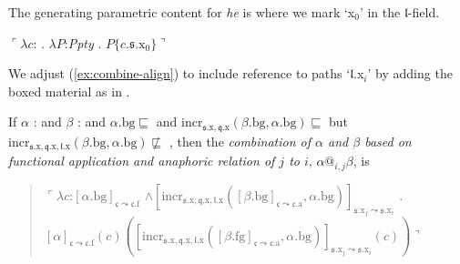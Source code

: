 The generating parametric content for \textit{he} is \nexteg{} where we
mark `x$_0$' in the $\mathfrak{l}$-field.
\begin{ex} 
  $\ulcorner\lambda c$: . $\lambda
  P$:\textit{Ppty} . $P\{c.\mathfrak{s}.\text{x}_0\}\urcorner$
\end{ex} 
We adjust (\ref{ex:combine-align}) to include reference to paths
`$\mathfrak{l}$.x$_i$' by adding the boxed material as in \nexteg{}.
\begin{ex} 
If $\alpha$ :  
and $\beta$ : 
and $\alpha.\text{bg}\sqsubseteq$  and
  $\mathrm{incr}_{\mathfrak{s}.\text{x},\mathfrak{q}.\text{x}}(\beta.\text{bg},\alpha.\text{bg})\sqsubseteq$
   but $\mathrm{incr}_{\mathfrak{s}.\text{x},\mathfrak{q}.\text{x},\mathfrak{l}.\text{x}}(\beta.\text{bg},\alpha.\text{bg})\not\sqsubseteq$
   ,
                         then the \textit{combination of $\alpha$ and
    $\beta$  based on functional application and anaphoric
      relation of $j$ to $i$}, $\alpha\text{@}_{i,j}\beta$, is
  \begin{quote}
    $\ulcorner\lambda c$:$[\alpha.\text{bg}]_{\mathfrak{c}\leadsto\mathfrak{c}.\text{f}}$
      \d{$\wedge$}$[\mathrm{incr}_{\mathfrak{s}.\text{x},\mathfrak{q}.\text{x},\mathfrak{l}.\text{x}}([\beta.\text{bg}]_{\mathfrak{c}\leadsto\mathfrak{c}.\text{a}},\alpha.\text{bg})]_{\mathfrak{s}.\text{x}_j\leadsto\mathfrak{s}.\text{x}_i}$
      . \\ \hspace*{2em}$[\alpha]_{\mathfrak{c}\leadsto\mathfrak{c}.\text{f}}(c)([\mathrm{incr}_{\mathfrak{s}.\text{x},\mathfrak{q}.\text{x},\mathfrak{l}.\text{x}}([\beta.\text{fg}]_{\mathfrak{c}\leadsto\mathfrak{c}.\text{a}},\alpha.\text{bg})]_{\mathfrak{s}.\text{x}_j\leadsto\mathfrak{s}.\text{x}_i}(c))\urcorner$
\end{quote}

\label{ex:combine-align-local}

\end{ex} 
